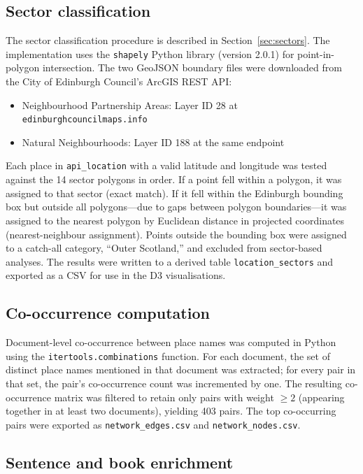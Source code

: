 \documentclass[logo,msc]{infthesis}
\begin{document}
\subsection*{Sector classification}
 
The sector classification procedure is described in Section~\ref{sec:sectors}. The implementation uses the \texttt{shapely} Python library (version 2.0.1) for point-in-polygon intersection. The two GeoJSON boundary files were downloaded from the City of Edinburgh Council's ArcGIS REST API:
 
\begin{itemize}
  \item Neighbourhood Partnership Areas: Layer ID 28 at \texttt{edinburghcouncilmaps.info}
  \item Natural Neighbourhoods: Layer ID 188 at the same endpoint
\end{itemize}
 
Each place in \texttt{api\_location} with a valid latitude and longitude was tested against the 14 sector polygons in order. If a point fell within a polygon, it was assigned to that sector (exact match). If it fell within the Edinburgh bounding box but outside all polygons---due to gaps between polygon boundaries---it was assigned to the nearest polygon by Euclidean distance in projected coordinates (nearest-neighbour assignment). Points outside the bounding box were assigned to a catch-all category, ``Outer Scotland,'' and excluded from sector-based analyses. The results were written to a derived table \texttt{location\_sectors} and exported as a CSV for use in the D3 visualisations.
 
\subsection*{Co-occurrence computation}
 
Document-level co-occurrence between place names was computed in Python using the \texttt{itertools.combinations} function. For each document, the set of distinct place names mentioned in that document was extracted; for every pair in that set, the pair's co-occurrence count was incremented by one. The resulting co-occurrence matrix was filtered to retain only pairs with weight $\geq 2$ (appearing together in at least two documents), yielding 403 pairs. The top co-occurring pairs were exported as \texttt{network\_edges.csv} and \texttt{network\_nodes.csv}.

\subsection*{Sentence and book enrichment}
\end{document}
